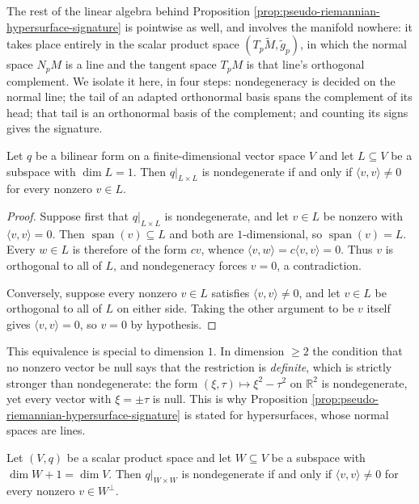 The rest of the linear algebra behind Proposition \ref{prop:pseudo-riemannian-hypersurface-signature} is pointwise as well, and involves the manifold nowhere: it takes place entirely in the scalar product space $(T_p\tilde M, \tilde g_p)$, in which the normal space $N_pM$ is a line and the tangent space $T_pM$ is that line's orthogonal complement. We isolate it here, in four steps: nondegeneracy is decided on the normal line; the tail of an adapted orthonormal basis spans the complement of its head; that tail is an orthonormal basis of the complement; and counting its signs gives the signature.

\begin{lemma}
\label{lem:nondegenerate-line}
\leanok
Let $q$ be a bilinear form on a finite-dimensional vector space $V$ and let $L \subseteq V$ be a subspace with $\dim L = 1$. Then $q|_{L \times L}$ is nondegenerate if and only if $\langle v,v \rangle \neq 0$ for every nonzero $v \in L$.
\end{lemma}

\begin{proof}
\leanok
Suppose first that $q|_{L\times L}$ is nondegenerate, and let $v \in L$ be nonzero with $\langle v,v\rangle = 0$. Then $\operatorname{span}(v) \subseteq L$ and both are $1$-dimensional, so $\operatorname{span}(v) = L$. Every $w \in L$ is therefore of the form $cv$, whence $\langle v,w\rangle = c\langle v,v\rangle = 0$. Thus $v$ is orthogonal to all of $L$, and nondegeneracy forces $v = 0$, a contradiction.

Conversely, suppose every nonzero $v \in L$ satisfies $\langle v,v\rangle \neq 0$, and let $v \in L$ be orthogonal to all of $L$ on either side. Taking the other argument to be $v$ itself gives $\langle v,v \rangle = 0$, so $v = 0$ by hypothesis.
\end{proof}

This equivalence is special to dimension $1$. In dimension $\geq 2$ the condition that no nonzero vector be null says that the restriction is \emph{definite}, which is strictly stronger than nondegenerate: the form $(\xi,\tau) \mapsto \xi^2 - \tau^2$ on $\mathbb{R}^2$ is nondegenerate, yet every vector with $\xi = \pm\tau$ is null. This is why Proposition \ref{prop:pseudo-riemannian-hypersurface-signature} is stated for hypersurfaces, whose normal spaces are lines.

\begin{lemma}
\label{lem:hyperplane-nondegenerate}
\leanok
{}
Let $(V,q)$ be a scalar product space and let $W \subseteq V$ be a subspace with $\dim W + 1 = \dim V$. Then $q|_{W\times W}$ is nondegenerate if and only if $\langle v,v\rangle \neq 0$ for every nonzero $v \in W^\perp$.
\end{lemma}

